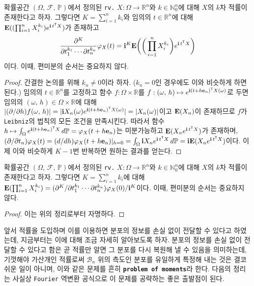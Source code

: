 \begin{theorem}\label{thm:CFDifferentiation}
    확률공간 $(\Omega,\,\mathcal{F},\,\mathbb{P})$에서 정의된 \texttt{rv.} $X:\Omega\to\mathbb{R}^n$와 $k\in\mathbb{N}_0^n$에 대해 $X$의 $k$차 적률이 존재한다고 하자. 그렇다면 $K=\sum_{i=1}^nk_i$와 임의의 $t\in\mathbb{R}^n$에 대해 $\mathbf{E}((\prod_{i=1}^nX_i^{k_i})e^{\mathbf{i}\,t^{\mathsf{T}} X})$가 존재하고
    \begin{equation*}
        \frac{\partial^K}{\partial t_1^{k_1}\cdots\partial t_n^{k_n}}\varphi_X(t)=\mathbf{i}^K\mathbf{E}\bigg(\bigg(\prod_{i=1}^nX_i^{k_i}\bigg)e^{\mathbf{i}\,t^{\mathsf{T}} X}\bigg)
    \end{equation*}
    이다. 이때, 편미분의 순서는 중요하지 않다.
\end{theorem}

\begin{proof}
    간결한 논의를 위해 $k_n\ne0$이라 하자. ($k_n=0$인 경우에도 이와 비슷하게 하면 된다.) 임의의 $t\in\mathbb{R}^n$를 고정하고 함수 $f:\Omega\times\mathbb{R}$를 $f:(\omega,\,h)\mapsto e^{\mathbf{i}(t+h\mathbf{e}_n)^{\mathsf{T}} X(\omega)}$로 두면 임의의 $(\omega,\,h)\in\Omega\times\mathbb{R}$에 대해 $|(\partial/\partial h)f(\omega,\,h)|=|\mathbf{i} X_n(\omega)e^{\mathbf{i}(t+h\mathbf{e}_n)^{\mathsf{T}} X(\omega)}|=|X_n(\omega)|$이고 $\mathbf{E}(X_n)$이 존재하므로 $f$가 \texttt{Leibniz}의 법칙의 모든 조건을 만족시킨다. 따라서 함수 $h\mapsto\int_\Omega e^{\mathbf{i}(t+h\mathbf{e}_n)^{\mathsf{T}} X}\,d\mathbb{P}=\varphi_X(t+h\mathbf{e}_n)$는 미분가능하고 $\mathbf{E}(X_ne^{\mathbf{i}\,t^{\mathsf{T}} X})$가 존재하며, $(\partial/\partial t_n)\varphi_X(t)=(d/dh)\varphi_X(t+h\mathbf{e}_n)\vert_{h=0}=\int_\Omega\mathbf{i} X_ne^{\mathbf{i}\,t^{\mathsf{T}} X}\,d\mathbb{P}=\mathbf{i}\mathbf{E}(X_ne^{\mathbf{i}\,t^{\mathsf{T}} X})$이다. 이제 이와 비슷하게 $K-1$번 반복하면 원하는 결과를 얻는다.
\end{proof}

\begin{corollary}
    확률공간 $(\Omega,\,\mathcal{F},\,\mathbb{P})$에서 정의된 \texttt{rv.} $X:\Omega\to\mathbb{R}^n$와 $k\in\mathbb{N}_0^n$에 대해 $X$의 $k$차 적률이 존재한다고 하자. 그렇다면 $K=\sum_{i=1}^nk_i$에 대해 $\mathbf{E}(\prod_{i=1}^nX_i^{k_i})=(\partial^K/\partial t_1^{k_1}\cdots\partial t_n^{k_n})\varphi_X(0)/\mathbf{i}^K$이다. 이때, 편미분의 순서는 중요하지 않다.
\end{corollary}

\begin{proof}
    이는 위의 정리로부터 자명하다.
\end{proof}

앞서 적률을 도입하며 이를 이용하면 분포의 정보를 손실 없이 전달할 수 있다고 하였는데, 지금부터는 이에 대해 조금 자세히 알아보도록 하자. 분포의 정보를 손실 없이 전달할 수 있다고 함은 곧 적률만 알면 그 분포를 다시 복원해 낼 수 있음을 의미하는데, 기껏해야 가산개인 적률로써 $\mathcal{B}_n$ 위의 측도인 분포를 유일하게 특정해 내는 것은 결코 쉬운 일이 아니며, 이와 같은 문제를 흔히 \textbf{\texttt{problem of moments}}라 한다. 다음의 정리는 사실상 \texttt{Fourier} 역변환 공식으로 이 문제를 공략하는 좋은 출발점이 된다.

